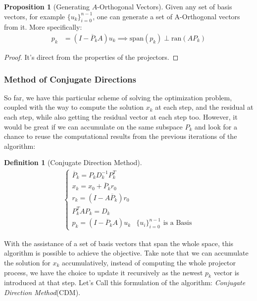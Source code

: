 \documentclass[]{article}
\theoremstyle{definition}
\newtheorem{prop}{Proposition}[section]  %
\newtheorem{definition}{Definition}      %
\begin{document}
            
            \begin{prop}[Generating $A$-Orthogonal Vectors]
                Given any set of basis vectors, for example $\{u_k\}_{i = 0}^{n - 1}$, one can generate a set of A-Orthogonal vectors from it. More specifically:
                \begin{align}
                    p_k &= (I - \overline{P}_kA)u_k \implies\text{span}(p_k) \perp \text{ran}(AP_k)
                \end{align}
            \end{prop}
            \begin{proof}
                It's direct from the properties of the projectors.
            \end{proof}
            
        \subsubsection{Method of Conjugate Directions}
            So far, we have this particular scheme of solving the optimization problem, coupled with the way to compute the solution $x_k$ at each step, and the residual at each step, while also getting the residual vector at each step too. However, it would be great if we can accumulate on the same subspace $P_k$ and look for a chance to reuse the computational results from the previous iterations of the algorithm: 
            \begin{definition}[Conjugate Direction Method]
                \begin{align}
                    \begin{cases}
                        \overline{P}_k = P_kD^{-1}_kP_k^T
                        \\
                        x_k = x_0 + \overline{P}_k r_0
                        \\
                        r_k = (I - A\overline{P}_k) r_0
                        \\
                        P^T_kAP_k = D_k
                        \\
                        p_k = (I - \overline{P}_kA)u_k & \{u_i\}_{i = 0}^{n - 1} \text{ is a Basis}
                    \end{cases}
                \end{align}
            \end{definition}
            With the assistance of a set of basis vectors that span the whole space, this algorithm is possible to achieve the objective. Take note that we can accumulate the solution for $x_k$ accumulatively, instead of computing the whole projector process, we have the choice to update it recursively as the newest $p_k$ vector is introduced at that step. Let's Call this formulation of the algorithm: \textit{Conjugate Direction Method}(CDM). 
\end{document}
